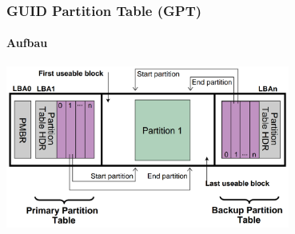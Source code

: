\begin{frame}
    \frametitle{GUID Partition Table (GPT)}
    \framesubtitle{Aufbau}

    \centering
    \includegraphics[width=0.7\textwidth]{content/graphics/GPT_Layout.png}
\end{frame}




